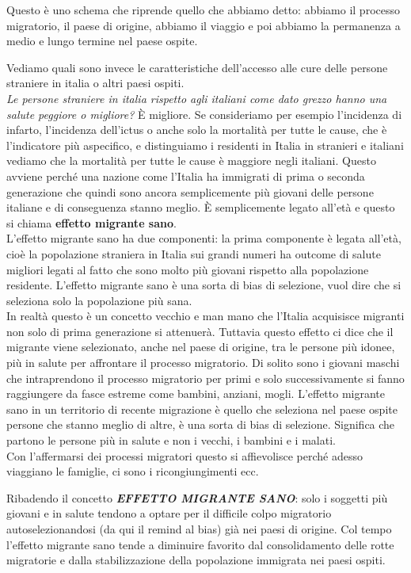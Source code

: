 Questo è uno schema che riprende quello che abbiamo detto: abbiamo il
processo migratorio, il paese di origine, abbiamo il viaggio e poi
abbiamo la permanenza a medio e lungo termine nel paese ospite.

Vediamo quali sono invece le caratteristiche dell'accesso alle cure
delle persone straniere in italia o altri paesi ospiti.\\
\emph{Le persone straniere in italia rispetto agli italiani come dato
grezzo hanno una salute peggiore o migliore?} È migliore. Se
consideriamo per esempio l'incidenza di infarto, l'incidenza dell'ictus
o anche solo la mortalità per tutte le cause, che è l'indicatore più
aspecifico, e distinguiamo i residenti in Italia in stranieri e italiani
vediamo che la mortalità per tutte le cause è maggiore negli italiani.
Questo avviene perché una nazione come l'Italia ha immigrati di prima o
seconda generazione che quindi sono ancora semplicemente più giovani
delle persone italiane e di conseguenza stanno meglio. È semplicemente
legato all'età e questo si chiama \textbf{effetto migrante sano}.\\
L'effetto migrante sano ha due componenti: la prima componente è legata
all'età, cioè la popolazione straniera in Italia sui grandi numeri ha
outcome di salute migliori legati al fatto che sono molto più giovani
rispetto alla popolazione residente. L'effetto migrante sano è una sorta
di bias di selezione, vuol dire che si seleziona solo la popolazione più
sana.\\
In realtà questo è un concetto vecchio e man mano che l'Italia
acquisisce migranti non solo di prima generazione si attenuerà. Tuttavia
questo effetto ci dice che il migrante viene selezionato, anche nel
paese di origine, tra le persone più idonee, più in salute per
affrontare il processo migratorio. Di solito sono i giovani maschi che
intraprendono il processo migratorio per primi e solo successivamente si
fanno raggiungere da fasce estreme come bambini, anziani, mogli.
L'effetto migrante sano in un territorio di recente migrazione è quello
che seleziona nel paese ospite persone che stanno meglio di altre, è una
sorta di bias di selezione. Significa che partono le persone più in
salute e non i vecchi, i bambini e i malati.\\
Con l'affermarsi dei processi migratori questo si affievolisce perché
adesso viaggiano le famiglie, ci sono i ricongiungimenti ecc.

Ribadendo il concetto \textbf{\emph{EFFETTO MIGRANTE SANO}}: solo i
soggetti più giovani e in salute tendono a optare per il difficile colpo
migratorio autoselezionandosi (da qui il remind al bias) già nei paesi
di origine. Col tempo l'effetto migrante sano tende a diminuire favorito
dal consolidamento delle rotte migratorie e dalla stabilizzazione della
popolazione immigrata nei paesi ospiti.

